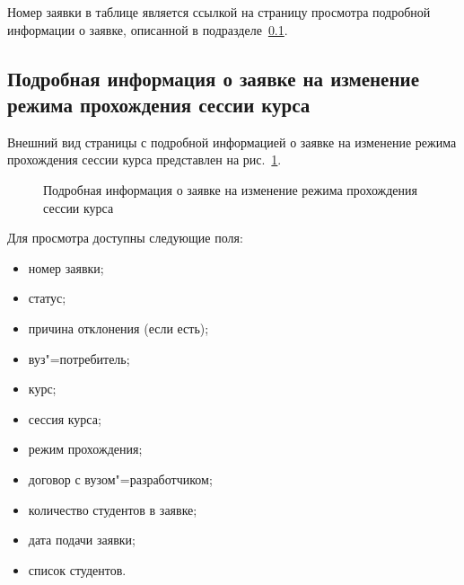 Номер заявки в таблице является ссылкой на страницу просмотра подробной информации о заявке, 
описанной в подразделе~\ref{sec:change_mode_req_detail}.

\subsection{Подробная информация о заявке на изменение режима прохождения сессии курса} 
\label{sec:change_mode_req_detail}

Внешний вид страницы с подробной информацией о заявке на изменение режима прохождения сессии курса представлен 
на рис.~\ref{img:student:change_mode_req_detail}.
\begin{figure}[H]
	\caption{Подробная информация о заявке на изменение режима прохождения сессии курса}
	\label{img:student:change_mode_req_detail}
\end{figure}

Для просмотра доступны следующие поля:
\begin{itemize}
	\item номер заявки;
	\item статус;
	\item причина отклонения (если есть);
	\item вуз"=потребитель;
	\item курс;
	\item сессия курса;
	\item режим прохождения;
	\item договор с вузом"=разработчиком;
	\item количество студентов в заявке;
	\item дата подачи заявки;
	\item список студентов.
\end{itemize}


